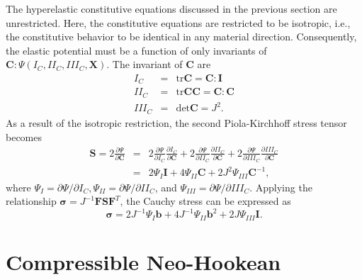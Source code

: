 The hyperelastic constitutive equations discussed in the previous section are unrestricted. Here, the constitutive equations are restricted to be isotropic, i.e., the constitutive behavior to be identical in any material direction. Consequently, the elastic potential must be a function of only invariants of $\pmb{C}: \Psi(I_C,II_C,III_C,\pmb{X})$. The invariant of $\pmb{C}$ are
%
\begin{eqnarray}
I_C &=& \text{tr}\pmb{C} = \pmb{C}:\pmb{I} \nonumber\\
II_C &=& \text{tr}\pmb{C}\pmb{C} = \pmb{C}:\pmb{C} \nonumber\\
III_C &=& \text{det}\pmb{C} = J^2 .
\label{eq:invariants}
\end{eqnarray}
%
As a result of the isotropic restriction, the second Piola-Kirchhoff stress tensor becomes
%
\begin{eqnarray}
\pmb{S} = 2\frac{\partial \Psi}{\partial \pmb{C}} &=& 2 \frac{\partial \Psi}{\partial I_C}\frac{\partial I_C}{\partial \pmb{C}} + 2\frac{\partial \Psi}{\partial II_C}\frac{\partial II_C}{\partial \pmb{C}} + 2\frac{\partial \Psi}{\partial III_C}\frac{\partial III_C}{\partial \pmb{C}} \nonumber\\
&=&2\Psi_I \pmb{I} + 4\Psi_{II} \pmb{C} + 2J^2\Psi_{III}\pmb{C}^{-1},
\end{eqnarray}
%
where $\Psi_I = \partial \Psi/\partial I_C, \Psi_{II} = \partial \Psi/\partial II_C$, and $\Psi_{III} = \partial \Psi/\partial III_C$. Applying the relationship $\pmb{\sigma} = J^{-1}\pmb{F}\pmb{S}\pmb{F}^T$, the Cauchy stress can be expressed as
%
\begin{equation}
\pmb{\sigma} = 2J^{-1}\Psi_I \pmb{b} + 4J^{-1}\Psi_{II} \pmb{b}^2 + 2J\Psi_{III} \pmb{I}.
\label{eq:sigma_isotropic}
\end{equation}


\section{Compressible Neo-Hookean}

